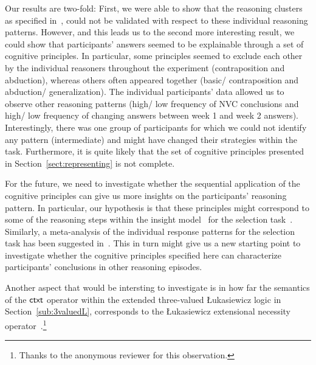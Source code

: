 \documentclass[12pt]{article}
\begin{document}
Our results are two-fold: First, we were able to show that the reasoning clusters as specified in~\cite{declare:2017}, could not be validated
with respect to these individual reasoning patterns. However, and this leads us to the second more interesting result,
we could show that participants' answers seemed to be explainable through a set of cognitive principles. In particular,
some principles seemed to exclude each other by the individual reasoners throughout the experiment (contraposition and abduction), whereas others often appeared together (basic/ contraposition and abduction/ generalization). 
The individual participants' data allowed us to observe other reasoning patterns (high/ low frequency of NVC conclusions and high/ low frequency of changing answers between week 1 and week 2 answers). 
Interestingly, there was one group of participants for which we could not identify any pattern (intermediate)
and might have changed their strategies within the task.
Furthermore, it is quite likely that the set of cognitive principles presented in Section~\ref{sect:representing} is not complete.

For the future, we need to investigate whether the sequential application of the cognitive principles 
can give us more insights on the participants' reasoning pattern. In particular, our hypothesis is that these principles might correspond to some of the reasoning steps within the insight model~\cite{johnsonlaird:1970} for the selection task~\cite{wason:68}. Similarly, a meta-analysis of the individual response patterns for the selection task has been suggested in~\cite{ragni:2017}.
This in turn might give us a new starting point to investigate whether the cognitive principles  specified here can characterize participants' conclusions in other reasoning episodes.

Another aspect that would be intersting to investigate is in how far the semantics of the $\mathsf{ctxt}$ operator within the extended three-valued {\L}ukasiewicz logic in Section~\ref{sub:3valuedL}, 
 corresponds to the {\L}ukasiewicz extensional necessity operator~\cite{}.\footnote{Thanks to the
 anonymous reviewer for this observation.}





\end{document}
